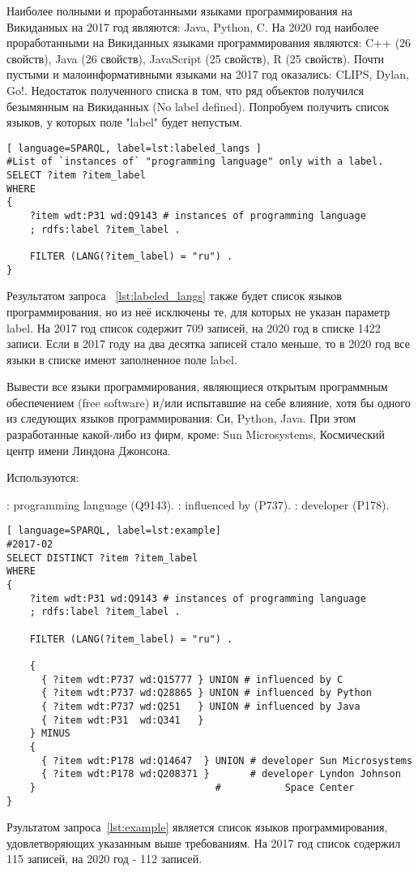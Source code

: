 Наиболее полными и проработанными языками программирования на Викиданных на 2017 год являются: Java, Python, C. На 2020 год наиболее проработанными на Викиданных языками программирования являются: C++ (26 свойств), Java (26 свойств), JavaScript (25 свойств), R (25 свойств).
Почти пустыми и малоинформативными языками на 2017 год оказались: CLIPS, Dylan, Go!.
Недостаток полученного списка в том, что ряд объектов получился безымянным на Викиданных (No label defined). Попробуем получить список языков, у которых поле "label" будет непустым.


\begin{lstlisting}[ language=SPARQL, label=lst:labeled_langs ]
#List of `instances of` "programming language" only with a label.
SELECT ?item ?item_label
WHERE
{
    ?item wdt:P31 wd:Q9143 # instances of programming language
    ; rdfs:label ?item_label . 

    FILTER (LANG(?item_label) = "ru") . 
}
\end{lstlisting}
Результатом запроса ~\ref{lst:labeled_langs} также будет список языков программирования, но из неё исключены те, для которых не указан параметр label. На 2017 год список содержит 709 записей, на 2020 год в списке 1422 записи. Если в 2017 году на два десятка записей стало меньше, то в 2020 год все языки в списке имеют заполненное поле label.

Вывести все языки программирования, являющиеся открытым программным обеспечением (free software) и/или испытавшие на себе влияние, хотя бы одного из следующих языков программирования: Си, Python, Java. При этом разработанные какой-либо из фирм, кроме: Sun Microsystems, Космический центр имени Линдона Джонсона.

Используются:
\begin{itemize}
: programming language (Q9143).
: influenced by (P737).
: developer (P178).
\end{itemize}

\begin{lstlisting}[ language=SPARQL, label=lst:example]
#2017-02
SELECT DISTINCT ?item ?item_label
WHERE
{
    ?item wdt:P31 wd:Q9143 # instances of programming language
    ; rdfs:label ?item_label . 

    FILTER (LANG(?item_label) = "ru") . 

    {
      { ?item wdt:P737 wd:Q15777 } UNION # influenced by C
      { ?item wdt:P737 wd:Q28865 } UNION # influenced by Python
      { ?item wdt:P737 wd:Q251   } UNION # influenced by Java
      { ?item wdt:P31  wd:Q341   }
    } MINUS 
  	{ 
      { ?item wdt:P178 wd:Q14647  } UNION # developer Sun Microsystems
      { ?item wdt:P178 wd:Q208371 }       # developer Lyndon Johnson
    }  							    # 		    Space Center
}
\end{lstlisting}
Рзультатом запроса~\ref{lst:example} является список языков программирования, удовлетворяющих указанным выше требованиям. На 2017 год список содержил 115 записей, на 2020 год - 112 записей.

